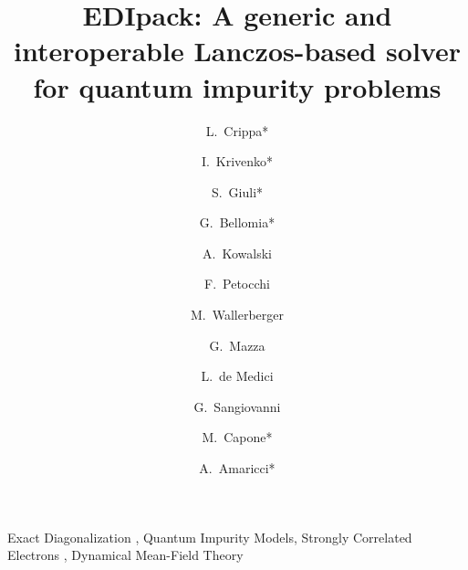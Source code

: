 \documentclass[preprint,3p,10pt]{elsarticle}
\begin{document}
\begin{frontmatter}

\title{EDIpack: A generic and interoperable Lanczos-based solver for quantum impurity problems}
\author[a,b,c]{L.~Crippa*}
\author[a]{I.~Krivenko*}
\author[d]{S.~Giuli*}
\author[d]{G.~Bellomia*}
\author[c]{A.~Kowalski}
\author[e]{F.~Petocchi}
\author[f]{M.~Wallerberger}
\author[g]{G.~Mazza}
\author[h]{L.~de Medici}
\author[c,b]{G.~Sangiovanni}
\author[d,i]{M.~Capone*}
\author[i]{A.~Amaricci*}

\newcommand{\CNRIOM}{CNR-IOM, Istituto Officina dei Materiali,
  Consiglio Nazionale delle Ricerche, Via Bonomea 265, 34136
  Trieste, Italy}
\newcommand{\SISSA}{Scuola Internazionale Superiore di Studi Avanzati (SISSA),
  Via Bonomea 265, 34136 Trieste, Italy}
\newcommand{\ITPHamburg}{I. Institute of Theoretical Physics,
  University of Hamburg, Notkestrasse 9, 22607 Hamburg, Germany}
\newcommand{\WZBURG}{Institut f\"ur Theoretische Physik und
  Astrophysik,Universit\"at W\"urzburg, 97074 W\"urzburg, Germany}
\newcommand{\CTQMAT}{W\"urzburg-Dresden Cluster of Excellence ct.qmat, 01062 Dresden, Germany}
\newcommand{\Geneve}{Department of Quantum Matter Physics, University of
  Geneva, Quai Ernest-Ansermet 24, 1211 Geneva, Switzerland}
\newcommand{\UPISA}{Department of Physics ``E. Fermi'' University of
  Pisa, Largo B. Pontecorvo 3, 56127 Pisa, Italy}
\newcommand{\ESPCI}{LPEM, ESPCI Paris, PSL Research University, CNRS, Sorbonne Universit\'e, 75005 Paris, France}
\newcommand{\TUW}{Institure of Solid State Physics, TU Wien, 1040 Vienna, Austria}

\address[a]{\ITPHamburg}
\address[b]{\CTQMAT}
\address[c]{\WZBURG}
\address[d]{\SISSA}
\address[e]{\Geneve}
\address[f]{\TUW}
\address[g]{\UPISA}
\address[h]{\ESPCI}
\address[i]{\CNRIOM}

\begin{abstract}
  
\end{abstract}

\begin{keyword}
  Exact Diagonalization \sep
  Quantum Impurity Models\sep  
  Strongly Correlated Electrons \sep  
  Dynamical Mean-Field Theory
\end{keyword}

\end{frontmatter}
\end{document}
